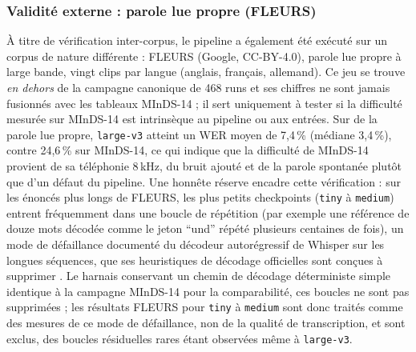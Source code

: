 \documentclass[12pt]{report}
\begin{document}
\subsubsection{Validité externe : parole lue propre (FLEURS)}
À titre de vérification inter-corpus, le pipeline a également été exécuté sur un corpus de nature différente : FLEURS (Google, CC-BY-4.0), parole lue propre à large bande, vingt clips par langue (anglais, français, allemand). Ce jeu se trouve \emph{en dehors} de la campagne canonique de 468 runs et ses chiffres ne sont jamais fusionnés avec les tableaux MInDS-14 ; il sert uniquement à tester si la difficulté mesurée sur MInDS-14 est intrinsèque au pipeline ou aux entrées. Sur de la parole lue propre, \texttt{large-v3} atteint un WER moyen de 7,4\,\% (médiane 3,4\,\%), contre 24,6\,\% sur MInDS-14, ce qui indique que la difficulté de MInDS-14 provient de sa téléphonie 8\,kHz, du bruit ajouté et de la parole spontanée plutôt que d'un défaut du pipeline. Une honnête réserve encadre cette vérification : sur les énoncés plus longs de FLEURS, les plus petits checkpoints (\texttt{tiny} à \texttt{medium}) entrent fréquemment dans une boucle de répétition (par exemple une référence de douze mots décodée comme le jeton \enquote{und} répété plusieurs centaines de fois), un mode de défaillance documenté du décodeur autorégressif de Whisper sur les longues séquences, que ses heuristiques de décodage officielles sont conçues à supprimer \cite{radford2023robust,koenecke2024careless}. Le harnais conservant un chemin de décodage déterministe simple identique à la campagne MInDS-14 pour la comparabilité, ces boucles ne sont pas supprimées ; les résultats FLEURS pour \texttt{tiny} à \texttt{medium} sont donc traités comme des mesures de ce mode de défaillance, non de la qualité de transcription, et sont exclus, des boucles résiduelles rares étant observées même à \texttt{large-v3}.
\end{document}
